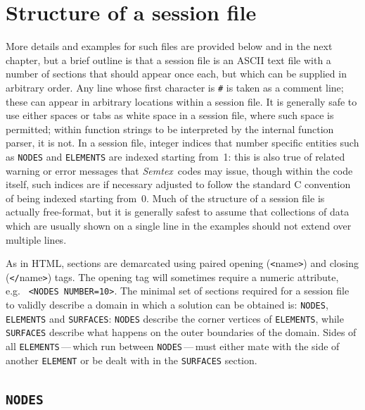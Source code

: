 \documentclass[11pt]{report}
\newcommand{\Semtex}{\emph{Semtex}} \newcommand{\Dog}{\emph{Dog}}
\newcommand{\eg}{e.g.\ } \newcommand{\CC}{\mathrm{c.c.}}
\begin{document}
\section{Structure of a session file}
\label{sec.session}

More details and examples for such files are provided below and in the
next chapter, but a brief outline is that a session file is an ASCII
text file with a number of sections that should appear once each, but
which can be supplied in arbitrary order.  Any line whose first
character is \verb+#+ is taken as a comment line; these can appear in
arbitrary locations within a session file.  It is generally safe to
use either spaces or tabs as white space in a session file, where such
space is permitted; within function strings to be interpreted by the
internal function parser, it is not.  In a session file, integer
indices that number specific entities such as \verb|NODES| and
\verb|ELEMENTS| are indexed starting from~1: this is also true of
related warning or error messages that \Semtex\ codes may issue,
though within the code itself, such indices are if necessary adjusted
to follow the standard C convention of being indexed starting from~0.
Much of the structure of a session file is actually free-format, but
it is generally safest to assume that collections of data which are
usually shown on a single line in the examples should not extend over
multiple lines.

As in HTML, sections are demarcated using paired opening
(\verb+<+name\verb+>+) and closing (\verb+</+name\verb+>+) tags.  The
opening tag will sometimes require a numeric attribute, \eg
\verb+<NODES NUMBER=10>+.  The minimal set of sections required for a
session file to validly describe a domain in which a solution can be
obtained is: \verb+NODES+, \verb+ELEMENTS+ and \verb+SURFACES+:
\verb+NODES+ describe the corner vertices of \verb+ELEMENTS+, while
\verb+SURFACES+ describe what happens on the outer boundaries of the
domain. Sides of all \verb+ELEMENTS+\,---\,which run between
\verb+NODES+\,---\,must either mate with the side of another
\verb+ELEMENT+ or be dealt with in the \verb+SURFACES+ section.

\subsection{\texttt{NODES}}
\label{sec.nodes}
\end{document}
